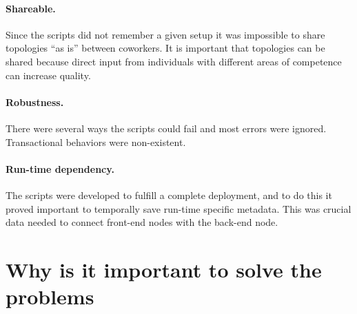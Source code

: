\paragraph{Shareable.}

Since the scripts did not remember a given setup it was impossible 
to share topologies ``as is'' between coworkers.
It is important that topologies can be shared because direct input from individuals
with different areas of competence can increase quality.

\paragraph{Robustness.}

There were several ways the scripts could fail and most errors were ignored.
Transactional behaviors were non-existent.

\paragraph{Run-time dependency.}

The scripts were developed to fulfill a complete deployment,
and to do this it proved important to temporally save run-time specific metadata.
This was crucial data needed to connect front-end nodes with the back-end node.


\section{Why is it important to solve the problems}



